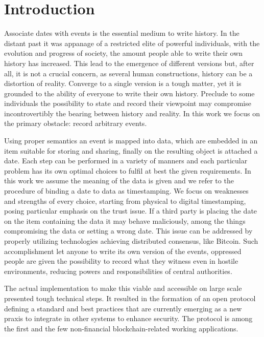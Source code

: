 \chapter{Introduction}
\label{chpr:intro}
Associate dates with events is the essential medium to write history. 
In the distant past it was appanage of a restricted elite of powerful individuals, with the evolution and progress of society, the amount people able to write their own history has increased.
This lead to the emergence of different versions but, after all, it is not a crucial concern, as several human constructions, history can be a distortion of reality.
Converge to a single version is a tough matter, yet it is grounded to the ability of everyone to write their own history.
Preclude to some individuals the possibility to state and record their viewpoint may compromise incontrovertibly the bearing between history and reality.
In this work we focus on the primary obstacle: record arbitrary events.

Using proper semantics an event is mapped into data, which are embedded in an item suitable for storing and sharing, finally on the resulting object is attached a date. 
Each step can be performed in a variety of manners and each particular problem has its own optimal choices to fulfil at best the given requirements. 
In this work we assume the meaning of the data is given and we refer to the procedure of binding a date to data as timestamping. 
We focus on weaknesses and strengths of every choice, starting from physical to digital timestamping, posing particular emphasis on the trust issue.
If a third party is placing the date on the item containing the data it may behave maliciously, among the things compromising the data or setting a wrong date. This issue can be addressed by properly utilizing technologies achieving distributed consensus, like Bitcoin.
Such accomplishment let anyone to write its own version of the events, oppressed people are given the possibility to record what they witness even in hostile environments, reducing powers and responsibilities of central authorities.

The actual implementation to make this viable and accessible on large scale presented tough technical steps. 
It resulted in the formation of an open protocol defining a standard and best practices \cite{OTSWeb} that are currently emerging as a new praxis to integrate in other systems to enhance security. 
The protocol is among the first and the few non-financial blockchain-related working applications.

